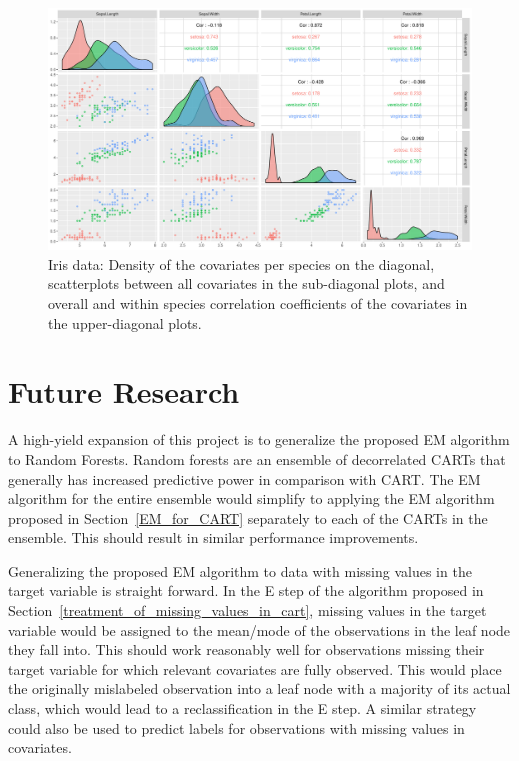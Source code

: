 \documentclass[12pt, twoside]{article}
\newcommand{\1}{\mathbb{1}}
\begin{document}
\begin{landscape}
 \begin{figure}
  \centering
  \includegraphics[height=0.8\textwidth]{plots/iris_data.pdf}
  \caption{Iris data: Density of the covariates per species on the diagonal, scatterplots between all covariates in the sub-diagonal plots, and overall and within species correlation coefficients of the covariates in the upper-diagonal plots.}
  \label{fig:iris}
 \end{figure}
\end{landscape}


\section{Future Research}\label{futre_research}

A high-yield expansion of this project is to generalize the proposed EM algorithm to Random Forests. Random forests are an ensemble of decorrelated CARTs \citep{breiman} that generally has increased predictive power in comparison with CART.
The EM algorithm for the entire ensemble would simplify to applying the EM algorithm proposed in Section~\ref{EM_for_CART} separately to each of the CARTs in the ensemble. This should result in similar performance improvements.

Generalizing the proposed EM algorithm to data with missing values in the target variable is straight forward. In the E step of the algorithm proposed in Section~\ref{treatment_of_missing_values_in_cart}, missing values in the target variable would be assigned to the mean/mode of the observations in the leaf node they fall into. This should work reasonably well for observations missing their target variable for which relevant covariates are fully observed. This would place the originally mislabeled observation into a leaf node with a majority of its actual class, which would lead to a reclassification in the E step. A similar strategy could also be used to predict labels for observations with missing values in covariates.
\end{document}
